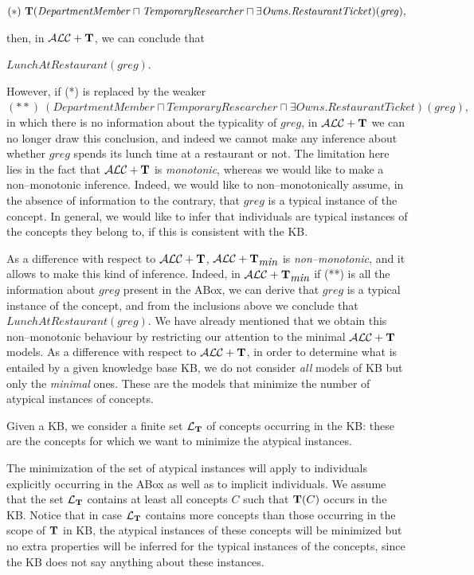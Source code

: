 \documentclass[a4paper, 11pt, oneside]{duthesis}
\newcommand{\tip}{{\bf T}}
\newcommand{\alct}{\mathcal{ALC}+\tip}
\newcommand{\alctmin}{\mathcal{ALC}+\tip_{\mbox{\em min}}}
\newcommand{\ellet} {\mathcal{L}_{\bf T}}
\begin{document}
$(*)  \ \tip(\mathit{DepartmentMember} \sqcap \mathit{TemporaryResearcher} \sqcap \exists \mathit{Owns}.\mathit{RestaurantTicket})(\mathit{greg}),$


\noindent then, in $\alct$, we can conclude that

$\mathit{LunchAtRestaurant(\mathit{greg})}.$

\noindent However, if (*) is replaced by the weaker $(**)  \ (\mathit{DepartmentMember} \sqcap \mathit{TemporaryResearcher} \sqcap \exists \mathit{Owns}.
\mathit{RestaurantTicket})(\mathit{greg}),$ in which there is no information about the typicality of $\mathit{greg}$, in $\alct$ we can no longer draw this conclusion, and indeed we cannot make any inference about whether $\mathit{greg}$ spends its lunch time at a restaurant or not. The limitation here lies in the fact that $\alct$ is {\em monotonic}, whereas we would like to make a non--monotonic inference.
Indeed, we would like to non--monotonically assume, in the absence of information to the contrary, that $\mathit{greg}$ is a typical instance of the concept.
In general, we would like to infer that individuals are typical instances of the concepts they belong to, if this is consistent with the KB.

As a difference with respect to $\alct$, $\alctmin$ is {\em non--monotonic}, and it allows to make this kind of inference.
Indeed, in $\alctmin$ if (**) is all the information about $\mathit{greg}$ present in the ABox, we can derive that $\mathit{greg}$ is a typical instance of the concept, and from the inclusions above we conclude that $\mathit{LunchAtRestaurant(\mathit{greg})}.$
We have already mentioned that we obtain this non--monotonic behaviour by restricting our attention to the  minimal $\alct$ models.
As a difference with respect to $\alct$, in order to determine what is entailed by a given knowledge base KB, we do not consider {\em all} models of KB but only the {\em minimal} ones.
These are the models that minimize the number of atypical instances of concepts.

Given a KB, we consider a finite set $\ellet$ of concepts occurring in the KB: these are the concepts for which we want to minimize the atypical instances.

The minimization of the set of atypical instances will apply to individuals explicitly occurring in the ABox as well as to implicit individuals.
We assume that the set $\ellet$ contains at least all concepts $C$ such that $\tip(C)$ occurs in the KB.
Notice that in case $\ellet$ contains more concepts than those occurring in the scope of $\tip$ in KB, the atypical instances of these concepts will be minimized but no extra properties will be inferred for the typical instances of the concepts, since the KB does not say anything about these instances.
\end{document}
